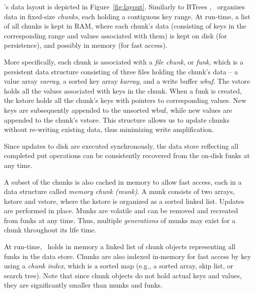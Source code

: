 \sys's data layout is depicted in Figure~\ref{fig:layout}.
Similarly to BTrees , 
\sys\ organizes data in fixed-size \emph{chunks}, each holding a contiguous key range.
At run-time, a list of all chunks is kept in RAM, where each chunk's data 
(consisting of keys in the corresponding range and values associated with them) 
is kept on disk (for persistence), and possibly in memory (for fast access). 

More specifically, each chunk is associated with a \emph{file chunk}, or \emph{funk},
which is a persistent data structure consisting of three files holding the chunk's data -- a value array \emph{varray}, 
a sorted key array \emph{karray}, and a write buffer \emph{wbuf}. The vstore holds all the values associated with keys
in the chunk. When a funk is created, the kstore holds all the chunk's keys with pointers to corresponding values.
New keys are subsequently appended to the unsorted wbuf, while new values are appended to the chunk's vstore.
This structure allows us to update chunks without re-writing existing data, thus minimizing write amplification.

Since updates to disk are executed synchronously,  the data store reflecting all completed put operations 
can be consistently recovered from the on-disk funks at any time. 

A subset of the chunks is also cached in memory to allow fast access, each in a data structure called \emph{memory chunk (munk)}. 
A munk consists of two arrays, kstore and vstore, where the kstore is organized as a sorted linked list. 
Updates are performed in place. Munks are volatile and can be removed and recreated from funks at any time.
Thus, multiple \emph{generations} of munks may exist for a chunk throughout its life time.

At run-time, \sys\ holds in memory a linked list of chunk objects representing all funks in the data store. 
Chunks are also indexed in-memory for fast access by key using a \emph{chunk index}, which is 
a sorted map (e.g., a sorted array, skip list, or search tree).
Note that since chunk objects do not hold actual keys and values, they are significantly smaller than munks and funks. 

